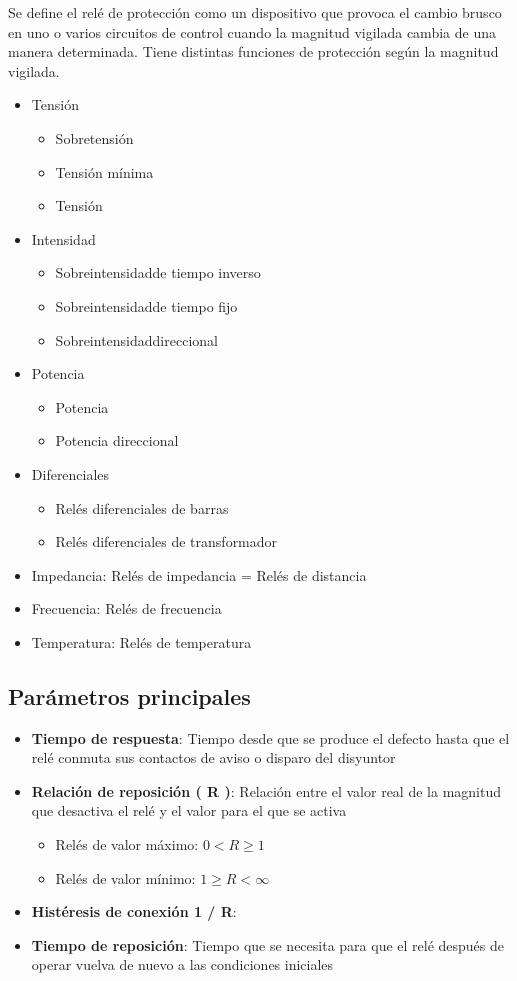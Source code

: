 Se define el relé de protección como un dispositivo que provoca el cambio brusco en uno o varios circuitos de control cuando la magnitud vigilada cambia de una manera determinada. Tiene distintas funciones de protección según la magnitud vigilada.
\begin{itemize}
	\item Tensión
	\begin{itemize}
		\item Sobretensión
		\item Tensión mínima
		\item Tensión
	\end{itemize}
	\item Intensidad
	\begin{itemize}
		\item  Sobreintensidadde tiempo inverso
		\item Sobreintensidadde tiempo fijo
		\item Sobreintensidaddireccional
	\end{itemize}
	\item Potencia
	\begin{itemize}
		\item  Potencia
		\item Potencia direccional
	\end{itemize}
	\item Diferenciales
	\begin{itemize}
		\item Relés diferenciales de barras
		\item Relés diferenciales de transformador
	\end{itemize}
	\item Impedancia: Relés de impedancia = Relés de distancia
	\item Frecuencia: Relés de frecuencia
	\item Temperatura: Relés de temperatura
\end{itemize}
\subsection{Parámetros principales}
\begin{itemize}
	\item \textbf{Tiempo de respuesta}: Tiempo desde que se produce el defecto hasta que el relé conmuta sus contactos de aviso o disparo del disyuntor
	\item \textbf{Relación de reposición ( R )}: Relación entre el valor real de la magnitud que desactiva el relé y el valor para el que se activa
	\begin{itemize}
		\item Relés de valor máximo: $0 < R \ge 1$
		\item Relés de valor mínimo: $1 \ge R < \infty$
	\end{itemize}
	\item \textbf{Histéresis de conexión 1 / R}:
	\item \textbf{Tiempo de reposición}: Tiempo que se necesita para que el relé después de operar vuelva de nuevo a las condiciones iniciales
\end{itemize}
